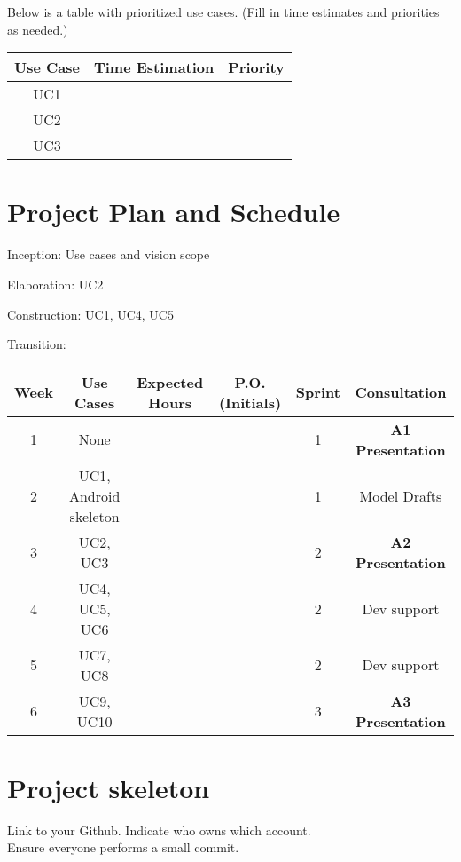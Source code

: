 \documentclass{article}
\begin{document}
Below is a table with prioritized use cases. (Fill in time estimates and priorities as needed.)

\begin{table}[h]
  \centering
  \begin{tabular}{|c|c|c|}
    \hline
    Use Case & Time Estimation & Priority \\ \hline
    UC1 &  &  \\ \hline
    UC2 &  &  \\ \hline
    UC3 &  &  \\ \hline
  \end{tabular}
\end{table}

\section{Project Plan and Schedule}

Inception: Use cases and vision scope

Elaboration: UC2

Construction: UC1, UC4, UC5

Transition:

\begin{longtable}{|c|c|c|c|c|c|}
    \hline
    \textbf{Week} & \textbf{Use Cases} & \textbf{Expected Hours} & \textbf{P.O. (Initials)} & \textbf{Sprint} & \textbf{Consultation} \\
    \hline
    1 & None &  &  & 1 & \textbf{A1 Presentation} \\
    \hline
    2 & UC1, Android skeleton &  &  & 1 & Model Drafts \\
    \hline
    3 & UC2, UC3 &  &  & 2 & \textbf{A2 Presentation} \\
    \hline
    4 & UC4, UC5, UC6 &  &  & 2 & Dev support \\
    \hline
    5 & UC7, UC8 &  &  & 2 & Dev support \\
    \hline
    6 & UC9, UC10 &  &  & 3 & \textbf{A3 Presentation} \\
    \hline
\end{longtable}

\section{Project skeleton}
Link to your Github. Indicate who owns which account. \\
Ensure everyone performs a small commit.
\end{document}
